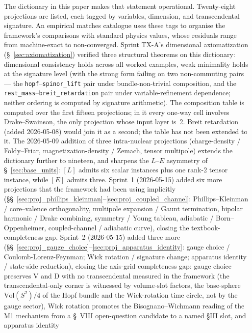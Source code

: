 \documentclass[11pt]{article}
\begin{document}
The dictionary in this paper makes that statement operational.
Twenty-eight projections are listed, each tagged by variables, dimension,
and transcendental signature.  An empirical matches catalogue uses
these tags to organise the framework's comparisons with standard
physics values, whose residuals range from machine-exact to
non-converged.  Sprint TX-A's
dimensional axiomatization (\S~\ref{sec:axiomatization}) verified
three structural theorems on this dictionary: dimensional consistency
holds across all worked examples, weak minimality holds at the
signature level (with the strong form failing on two non-commuting
pairs --- the \texttt{hopf}--\texttt{spinor\_lift} pair under
bundle-non-trivial composition, and the
\texttt{rest\_mass}--\texttt{breit\_retardation} pair under
variable-refinement dependence; neither ordering is computed by
signature arithmetic).  The composition table is computed over the
first fifteen projections; in it every one-way cell involves
Drake--Swainson, the only projection whose input layer is~2.  Breit
retardation (added 2026-05-08) would join it as a second; the table
has not been extended to it.  The 2026-05-09 addition of three intra-nuclear projections
(charge-density / Foldy--Friar, magnetization-density / Zemach,
tensor multipole) extends the dictionary further to nineteen, and
sharpens the $L$--$E$ asymmetry of \S~\ref{sec:base_units}: $[L]$
admits six scalar instances plus one rank-2 tensor instance, while
$[E]$ admits three.  Sprint~1 (2026-05-15) added six more
projections that the framework had been using implicitly
(\S\S~\ref{sec:proj_phillips_kleinman}--\ref{sec:proj_coupled_channel}:
Phillips--Kleinman / core--valence orthogonality, multipole expansion
/ Gaunt termination, bipolar harmonic / Drake combining, symmetry /
Young tableau, adiabatic / Born--Oppenheimer, coupled-channel /
adiabatic curve), closing the textbook-completeness gap.  Sprint~2
(2026-05-15) added three more
(\S\S~\ref{sec:proj_gauge_choice}--\ref{sec:proj_apparatus_identity}:
gauge choice / Coulomb-Lorenz-Feynman; Wick rotation / signature
change; apparatus identity / state-side reduction), closing the
axis-grid completeness gap: gauge choice preserves V and D with no
transcendental measured in the framework (the transcendental-only corner
is witnessed by volume-slot factors, the base-sphere $\mathrm{Vol}(S^2)/4$
of the Hopf bundle and the Wick-rotation time circle, not by the gauge
sector), Wick rotation
promotes the
Bisognano--Wichmann reading of the M1 mechanism from a \S~VIII
open-question candidate to a named §III slot, and apparatus identity
\end{document}

